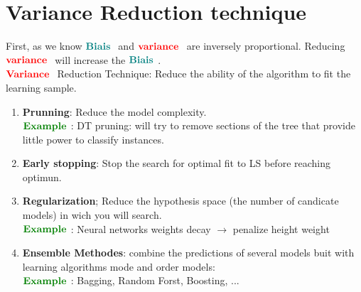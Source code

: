 \section{Variance Reduction technique}

First, as we know $\textcolor{teal}{\textbf{Biais }}$ and $\textcolor{red}{\textbf{variance }}$ are inversely proportional. Reducing $\textcolor{red}{\textbf{variance }}$ will increase the $\textcolor{teal}{\textbf{Biais }}$.\\
$\textcolor{red}{\textbf{Variance }}$ Reduction Technique: Reduce the ability of the algorithm to fit the learning sample.
\begin{enumerate}
    \item \textbf{Prunning}: Reduce the model complexity.\\
    $\Example$: DT pruning: will try to remove sections of the tree that provide little power to classify instances.
    \item \textbf{Early stopping}: Stop the search for optimal fit to LS before reaching optimun.
    \item \textbf{Regularization}; Reduce the hypothesis space (the number of candicate models) in wich you will search.\\
    $\Example$: Neural networks weights decay $\rightarrow$ penalize height weight
    \item \textbf{Ensemble Methodes}: combine the predictions of several models buit with learning algorithms mode and order models:\\
    $\Example$: Bagging, Random Forst, Boosting, ...\\
\end{enumerate}
